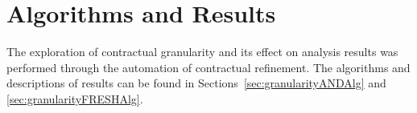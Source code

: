 \section{Algorithms and Results}
The exploration of contractual granularity and its effect on analysis results was performed through the automation of contractual refinement. The algorithms and descriptions of results can be found in Sections~\ref{sec:granularityANDAlg} and \ref{sec:granularityFRESHAlg}. %



%
%

